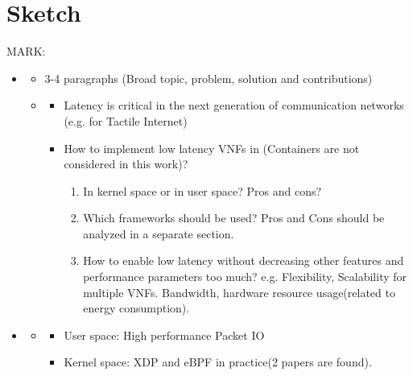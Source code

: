 \section{Sketch}
\label{sec:sketch}

MARK:  

\begin{itemize}[ $\leftarrow$ we keep the sketch of the storyline currently here only to have a overall view for the draft. This part will be deleted later on]
    \item \begin{itemize}[Introduction]
        \item 3-4 paragraphs (Broad topic, problem, solution and contributions)
        \item   \begin{itemize}[Motivation]
            \item Latency is critical in the next generation of communication networks (e.g. for Tactile Internet)
            \item {} How to implement low latency VNFs in (Containers are
                not considered in this work)?
                \begin{enumerate}
                    \item In kernel space or in user space? Pros and cons?
                    \item Which frameworks should be used? Pros and Cons should be analyzed in a separate section.
                    \item How to enable low latency without decreasing other features and performance parameters too
                        much? e.g. Flexibility, Scalability for multiple VNFs. Bandwidth, hardware resource usage(related to
                        energy consumption). 
                \end{enumerate}
        \end{itemize}
\end{itemize}

\item \begin{itemize}[Related Work]

    \item \begin{itemize}[Packet IO frameworks related papers]
        \item User space: High performance Packet IO
        \item Kernel space: XDP and eBPF in practice(2 papers are found).
    \end{itemize}


\end{itemize}
\end{itemize}
